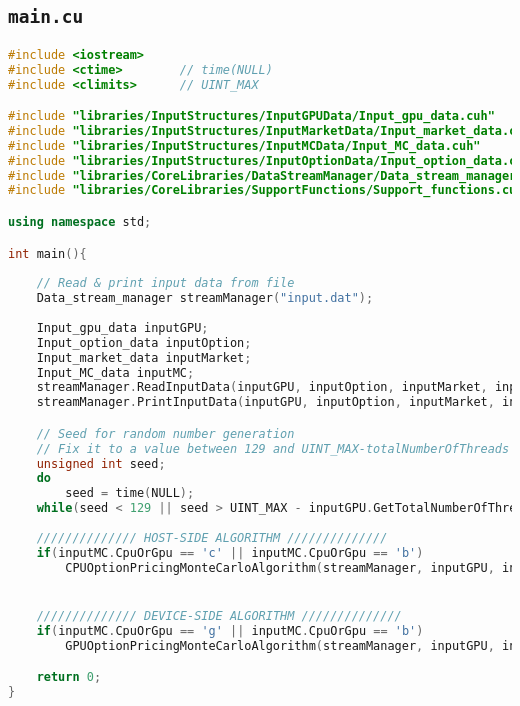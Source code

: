 \subsection{\texttt{main.cu}}
\lipsum[1-3]

\begin{lstlisting}[language=C++, caption={\texttt{main.cu}}]
#include <iostream>
#include <ctime>		// time(NULL)
#include <climits>		// UINT_MAX

#include "libraries/InputStructures/InputGPUData/Input_gpu_data.cuh"
#include "libraries/InputStructures/InputMarketData/Input_market_data.cuh"
#include "libraries/InputStructures/InputMCData/Input_MC_data.cuh"
#include "libraries/InputStructures/InputOptionData/Input_option_data.cuh"
#include "libraries/CoreLibraries/DataStreamManager/Data_stream_manager.cuh"
#include "libraries/CoreLibraries/SupportFunctions/Support_functions.cuh"

using namespace std;

int main(){
	
	// Read & print input data from file
	Data_stream_manager streamManager("input.dat");
	
	Input_gpu_data inputGPU;
	Input_option_data inputOption;
	Input_market_data inputMarket;
	Input_MC_data inputMC;
	streamManager.ReadInputData(inputGPU, inputOption, inputMarket, inputMC);
	streamManager.PrintInputData(inputGPU, inputOption, inputMarket, inputMC);

	// Seed for random number generation
	// Fix it to a value between 129 and UINT_MAX-totalNumberOfThreads or let time(NULL) do its magic
	unsigned int seed;	
	do
		seed = time(NULL);
	while(seed < 129 || seed > UINT_MAX - inputGPU.GetTotalNumberOfThreads());	
	
	////////////// HOST-SIDE ALGORITHM //////////////
	if(inputMC.CpuOrGpu == 'c' || inputMC.CpuOrGpu == 'b')
		CPUOptionPricingMonteCarloAlgorithm(streamManager, inputGPU, inputOption, inputMarket, inputMC, seed);


	////////////// DEVICE-SIDE ALGORITHM //////////////
	if(inputMC.CpuOrGpu == 'g' || inputMC.CpuOrGpu == 'b')
		GPUOptionPricingMonteCarloAlgorithm(streamManager, inputGPU, inputOption, inputMarket, inputMC, seed);

	return 0;
}
\end{lstlisting}

